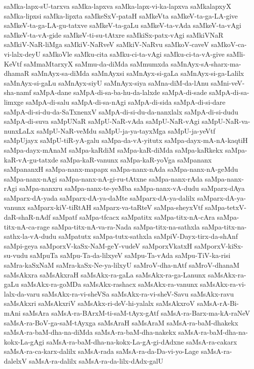 {saMka-lapx-sU-tarxva
saMka-lapxva
saMka-lapx-vi-ka-lapxva
saMkalapxyX
saMka-lipxsi
saMka-lipxta
saMkeSxV-pataH
saMkeVta
saMkeV-ta-ga-LA-give
saMkeV-ta-ga-LA-gu-tatxve
saMkeV-ta-gaLu
saMkeV-ta-vAda
saMkeV-ta-vAgi
saMkeV-ta-vA-gide
saMkeV-ti-su-tAtxre
saMkiSx-patx-vAgi
saMkiVNaR
saMkiV-NaR-liMga
saMkiV-NaRveV
saMkiV-NaRvu
saMkoV-caveV
saMkoV-ca-vi-lalx-deyU
saMkoVle
saMku-cita
saMku-ci-ta-vAgi
saMku-ci-ta-vA-give
saMli-KeVtf
saMmaMtarxyX
saMmu-da-diMda
saMmumxda
saMnAyx-sA-sharx-ma-dhamaR
saMnAyx-sa-diMda
saMnAyxsi
saMnAyx-si-gaLa
saMnAyx-si-ga-Lalilx
saMnAyx-si-gaLu
saMnAyx-siyU
saMnAyx-siya
saMna-diM-da-lAnu
saMni-veV-sha-namf
saMpA-dane
saMpA-di-sa-ba-hu-da-lalxde
saMpA-di-sade
saMpA-di-sa-limxge
saMpA-di-salu
saMpA-di-sa-nAgi
saMpA-di-sida
saMpA-di-si-dare
saMpA-di-si-du-da-SaTxnenxV
saMpA-di-si-du-da-nanxlalx
saMpA-di-si-dudu
saMpA-di-suva
saMpUNaR
saMpU-NaR-vAda
saMpU-NaR-vAgi
saMpU-NaR-va-nunxLaLx
saMpU-NaR-veMdu
saMpU-ja-ya-tayxMga
saMpU-ja-yeVtf
saMpUjayx
saMpU-tiR-yA-galu
saMpa-da-vA-yitutx
saMpa-dayx-mA-nA-kaqtiH
saMpa-dayx-mAnaM
saMpa-kaRdiM
saMpa-kaR-diMda
saMpa-kaRkekx
saMpa-kaR-vA-gu-tatxde
saMpa-kaR-vanunx
saMpa-kaR-yoVga
saMpananx
saMpananxH
saMpa-nanx-mapapx
saMpa-nanx-nAda
saMpa-nanx-nA-geMdu
saMpa-nanx-nAgi
saMpa-nanx-nA-gi-ru-tAtxne
saMpa-nanx-rAda
saMpa-nanx-rAgi
saMpa-nanxru
saMpa-nanx-te-yeMba
saMpa-nanx-vA-dudu
saMparx-dAya
saMparx-dA-yada
saMparx-dA-ya-daMte
saMparx-dA-ya-dalilx
saMparx-dA-ya-vanunx
saMparx-kiV-tiRtAH
saMparx-va-taRteV
saMpa-sheyxVtf
saMpa-tetxV-daR-shaR-nAdf
saMpatf
saMpa-tfcacx
saMpatitx
saMpa-titx-nA-cAra
saMpa-titx-nA-ca-rage
saMpa-titx-nA-va-ra-Nada
saMpa-titx-na-sathxla
saMpa-titx-na-sathx-la-vA-dudu
saMpatutx
saMpa-tutx-sathxla
saMpiV-Dayx-tirx-da-shAnf
saMpi-geya
saMporxV-kaSx-NaM-geY-vudeV
saMporxVkatxH
saMporxV-kiSx-su-vudu
saMpuTa
saMpu-Ta-da-lilxyeV
saMpu-Ta-vAda
saMpu-TiV-ka-risi
saMra-kaSxNaM
saMra-kaSx-Ne-ya-lilxyU
saMroV-dha-nAtf
saMroV-dhanaM
saMsAkxra
saMsAkxraH
saMsAkx-ra-gaLa
saMsAkx-ra-ga-Lanunx
saMsAkx-ra-gaLu
saMsAkx-ra-goMDa
saMsAkx-rashacx
saMsAkx-ra-vanunx
saMsAkx-ra-vi-lalx-da-varu
saMsAkx-ra-vi-sheVSa
saMsAkx-ra-vi-sheV-Savu
saMsAkx-ravu
saMsAkxri
saMsAkxriV
saMsAkx-ri-deV-hi-yalalx
saMsAkxroV
saMsA-rA-Bi-mAni
saMsAra
saMsA-ra-BArxM-ti-saM-tAyx-gAtf
saMsA-ra-Barx-ma-kA-raNeV
saMsA-ra-BoV-ga-saM-tAyxga
saMsAraH
saMsAraM
saMsA-ra-baM-dhakekx
saMsA-ra-baM-dha-na-diMda
saMsA-ra-baM-dha-nakekx
saMsA-ra-baM-dha-na-kokx-La-gAgi
saMsA-ra-baM-dha-na-kokx-La-gA-gi-dAdxne
saMsA-ra-cakarx
saMsA-ra-ca-karx-dalilx
saMsA-rada
saMsA-ra-da-Da-vi-yo-Lage
saMsA-ra-dalelxV
saMsA-ra-dalilx
saMsA-ra-da-lilx-dAdx-galU
}
